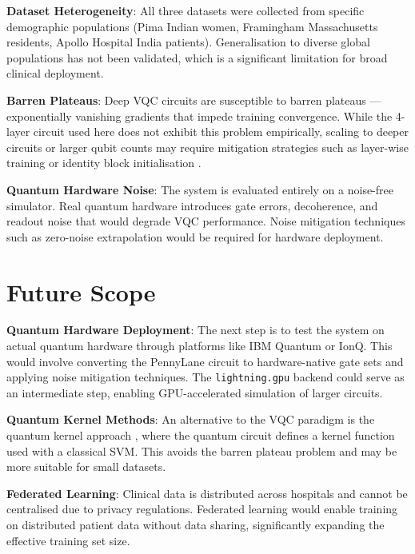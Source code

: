 ﻿\documentclass[conference]{IEEEtran}
\begin{document}
\textbf{Dataset Heterogeneity}: All three datasets were collected from specific
demographic populations (Pima Indian women, Framingham Massachusetts residents, Apollo
Hospital India patients). Generalisation to diverse global populations has not been
validated, which is a significant limitation for broad clinical deployment.

\textbf{Barren Plateaus}: Deep VQC circuits are susceptible to barren plateaus ---
exponentially vanishing gradients that impede training convergence. While the 4-layer
circuit used here does not exhibit this problem empirically, scaling to deeper circuits
or larger qubit counts may require mitigation strategies such as layer-wise training or
identity block initialisation \cite{grant2019initialization}.

\textbf{Quantum Hardware Noise}: The system is evaluated entirely on a noise-free
simulator. Real quantum hardware introduces gate errors, decoherence, and readout noise
that would degrade VQC performance. Noise mitigation techniques such as zero-noise
extrapolation \cite{temme2017error} would be required for hardware deployment.

\section{Future Scope}
\label{sec:future}

\textbf{Quantum Hardware Deployment}: The next step is to test the system on actual
quantum hardware through platforms like IBM Quantum or IonQ. This would involve
converting the PennyLane circuit to hardware-native gate sets and applying noise
mitigation techniques. The \texttt{lightning.gpu} backend could serve as an intermediate
step, enabling GPU-accelerated simulation of larger circuits.

\textbf{Quantum Kernel Methods}: An alternative to the VQC paradigm is the quantum
kernel approach \cite{havlicek2019supervised}, where the quantum circuit defines a kernel
function used with a classical SVM. This avoids the barren plateau problem and may be
more suitable for small datasets.

\textbf{Federated Learning}: Clinical data is distributed across hospitals and cannot be
centralised due to privacy regulations. Federated learning \cite{mcmahan2017federated}
would enable training on distributed patient data without data sharing, significantly
expanding the effective training set size.
\end{document}
